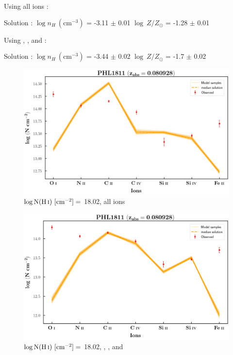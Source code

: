   Using all ions :
  
  Solution : $\log n_H \ (\text{cm}^{-3})$ = -3.11 $\pm$ 0.01 \hspace{10mm} $\log \ Z/Z_\odot$ = -1.28 $\pm$ 0.01 \newline  
  
  Using , ,  and  :
  
  Solution : $\log n_H \ (\text{cm}^{-3})$ = -3.44 $\pm$ 0.02 \hspace{10mm} $\log \ Z/Z_\odot$ = -1.7 $\pm$ 0.02 \newline 
  
  \newpage
  
  \begin{figure}[!t]
      \centering
      \includegraphics[width=0.9\linewidth]{Ionisation-Modelling-Plots/phl1811-z=0.080928-compIII_logZ=-1.png}
      \caption{$\log \text{N}(\ion{H}{i}) \ [\text{cm}^{-2}]=$ 18.02, all ions}
  \end{figure}
  
  \begin{figure}[!b]
      \centering
      \includegraphics[width=0.9\linewidth]{Ionisation-Modelling-Plots/phl1811-z=0.080928-compIII_logZ=-1_ions.png}
      \caption{$\log \text{N}(\ion{H}{i}) \ [\text{cm}^{-2}]=$ 18.02, , ,  and }
  \end{figure}
  
